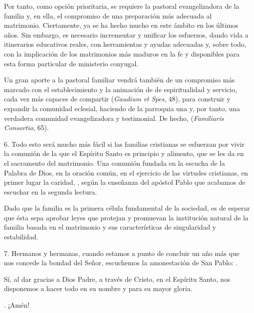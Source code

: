 \begin{body}
\begin{body}
		Por tanto, como opción prioritaria, se requiere la pastoral evangelizadora de la familia y, en ella, el compromiso de una preparación más adecuada al matrimonio. Ciertamente, ya se ha hecho mucho en este ámbito en los últimos años. Sin embargo, es necesario incrementar y unificar los esfuerzos, dando vida a itinerarios educativos reales, con herramientas y ayudas adecuadas y, sobre todo, con la implicación de los matrimonios más maduros en la fe y disponibles para esta forma particular de ministerio conyugal.
		
		Un gran aporte a la pastoral familiar vendrá también de un compromiso más marcado con el establecimiento y la animación de  de espiritualidad y servicio, cada vez más capaces de compartir  (\emph{Gaudium et Spes}, 48), para construir y expandir la comunidad eclesial, haciendo de la parroquia una  y, por tanto, una verdadera comunidad evangelizadora y testimonial. De hecho,  (\emph{Familiaris Consortio}, 65).
		
		6. Todo esto será mucho más fácil si las familias cristianas se esfuerzan por vivir la comunión de la que el Espíritu Santo es principio y alimento, que se les da en el sacramento del matrimonio. Una comunión fundada en la escucha de la Palabra de Dios, en la oración común, en el ejercicio de las virtudes cristianas, en primer lugar la caridad, , según la enseñanza del apóstol Pablo que acabamos de escuchar en la segunda lectura.
		
		Dado que la familia es la primera célula fundamental de la sociedad, es de esperar que ésta sepa aprobar leyes que protejan y promuevan la institución natural de la familia basada en el matrimonio y sus características de singularidad y estabilidad.
		
		7. Hermanos y hermanas, cuando estamos a punto de concluir un año más que nos concede la bondad del Señor, escuchemos la amonestación de San Pablo: .
		
		Sí, al dar gracias a Dios Padre, a través de Cristo, en el Espíritu Santo, nos disponemos a hacer todo en su nombre y para su mayor gloria.
		
		. ¡Amén!
		

\end{body}
\end{body}
